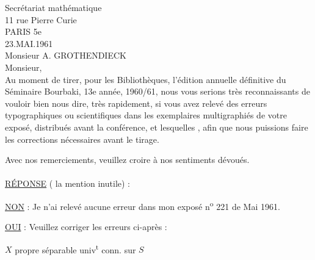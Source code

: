 

Secrétariat mathématique\\
11 rue Pierre Curie\\
PARIS 5e\\

23.MAI.1961\\

Monsieur A. GROTHENDIECK\\

Monsieur,\\

Au moment de tirer, pour les Bibliothèques, l'édition annuelle définitive du Séminaire Bourbaki, 13e année, 1960/61, nous vous serions très reconnaissants de vouloir bien nous dire, très rapidement, si vous avez relevé des erreurs typographiques ou scientifiques dans les exemplaires multigraphiés de votre exposé, distribués avant la conférence, et lesquelles , afin que nous puissions faire les corrections nécessaires avant le tirage.

Avec nos remerciements, veuillez croire à nos sentiments dévoués.\\

\\

\uline{RÉPONSE} ( la mention inutile) :

\uline{NON} : Je n'ai relevé aucune erreur dans mon exposé n\textsuperscript{o} 221 de Mai 1961.

\uline{OUI} : Veuillez corriger les erreurs ci-après :



\margin{\unsure{$-$\\$-$|$=$}}

$X$ propre séparable  univ\textsuperscript{t} conn. sur $S$

